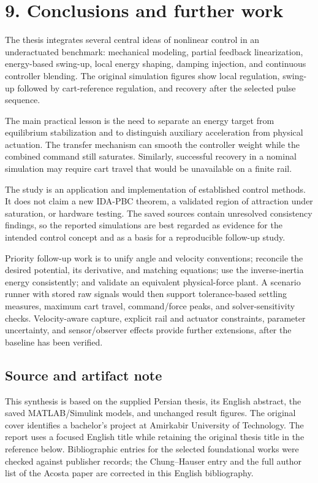 \documentclass[11pt,a4paper]{article}
\newcommand{\reportsection}[1]{\section*{\color{navy}#1}}
\newcommand{\topic}[1]{\subsection*{\color{teal}#1}}
\begin{document}
\clearpage
\reportsection{9. Conclusions and further work}
The thesis integrates several central ideas of nonlinear control in an underactuated benchmark: mechanical modeling, partial feedback linearization, energy-based swing-up, local energy shaping, damping injection, and continuous controller blending. The original simulation figures show local regulation, swing-up followed by cart-reference regulation, and recovery after the selected pulse sequence.

The main practical lesson is the need to separate an energy target from equilibrium stabilization and to distinguish auxiliary acceleration from physical actuation. The transfer mechanism can smooth the controller weight while the combined command still saturates. Similarly, successful recovery in a nominal simulation may require cart travel that would be unavailable on a finite rail.

The study is an application and implementation of established control methods. It does not claim a new IDA-PBC theorem, a validated region of attraction under saturation, or hardware testing. The saved sources contain unresolved consistency findings, so the reported simulations are best regarded as evidence for the intended control concept and as a basis for a reproducible follow-up study.

Priority follow-up work is to unify angle and velocity conventions; reconcile the desired potential, its derivative, and matching equations; use the inverse-inertia energy consistently; and validate an equivalent physical-force plant. A scenario runner with stored raw signals would then support tolerance-based settling measures, maximum cart travel, command/force peaks, and solver-sensitivity checks. Velocity-aware capture, explicit rail and actuator constraints, parameter uncertainty, and sensor/observer effects provide further extensions, after the baseline has been verified.

\topic{Source and artifact note}
This synthesis is based on the supplied Persian thesis, its English abstract, the saved MATLAB/Simulink models, and unchanged result figures. The original cover identifies a bachelor's project at Amirkabir University of Technology. The report uses a focused English title while retaining the original thesis title in the reference below. Bibliographic entries for the selected foundational works were checked against publisher records; the Chung--Hauser entry and the full author list of the Acosta paper are corrected in this English bibliography.
\end{document}

